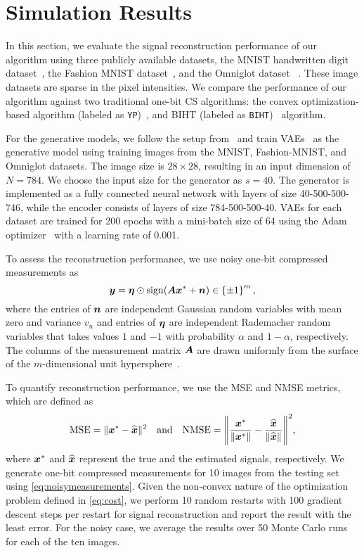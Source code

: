 \documentclass[journal]{IEEEtran}
\DeclareMathOperator{\sign}{sign}
\begin{document}
\section{Simulation Results}\label{sec:sim}
In this section, we evaluate the signal reconstruction performance of our algorithm using three publicly available datasets, the MNIST handwritten digit dataset~\cite{mnist2010LeCun}, the Fashion MNIST dataset~\cite{fashionMnist}, and the Omniglot dataset ~\cite{lake2015human}. These image datasets are sparse in the pixel intensities. We compare the performance of our algorithm against two traditional one-bit CS algorithms: the convex optimization-based algorithm (labeled as \texttt{YP})~\cite{plan2012robust}, and BIHT (labeled as \texttt{BIHT})~\cite{binarystableEmbedd} algorithm. 

For the generative models, we follow the setup from~\cite{bora2017compressed} and train VAEs~\cite{kingma2013auto} as the generative model using training images from the MNIST, Fashion-MNIST, and Omniglot datasets. The image size is $28\times 28$, resulting in an input dimension of $N=784$. We choose the input size for the generator as $s = 40$. The generator is implemented as a fully connected neural network with layers of size 40-500-500-746, while the encoder consists of layers of size 784-500-500-40. VAEs for each dataset are trained for 200 epochs with a mini-batch size of 64 using the Adam optimizer~\cite{kingma2014adam} with a learning rate of 0.001. 

To assess the reconstruction performance, we use noisy one-bit compressed measurements as
\begin{equation} \label{eq:noisymeasurements}
\bs{y}= \bs{\eta}\odot\sign(\matA\vecx^* + \bs{n} ) \in\lc\pm1\rc^m,    
\end{equation}
 where the entries of $\boldsymbol{n}$ are independent Gaussian random variables with mean zero and variance $v_n$ and entries of $\boldsymbol{\eta}$ are independent Rademacher random variables that takes values $1$ and $-1$ with probability $\alpha$ and $1-\alpha$, respectively. The columns of the measurement matrix $\boldsymbol{A}$  are drawn uniformly from the surface of the $m$-dimensional unit hypersphere~\cite{muller1959note}.

To quantify reconstruction performance, we use the MSE and NMSE metrics, which are defined as
\begin{equation}        
\mathrm{MSE} = \|\boldsymbol{x}^* -  \widehat{\boldsymbol{x}} \|^2\quad\text{and}\quad
        \mathrm{NMSE} = \Bigg\|\frac{\boldsymbol{x}^*}{ \| \boldsymbol{x}^*\|} -  \frac{\widehat{\boldsymbol{x}}}{ \| \widehat{\boldsymbol{x}} \|}  \Bigg\|^2,
  \end{equation}
 where $\boldsymbol{x}^*$ and $ \widehat{\boldsymbol{x}}$ represent the true and the estimated signals, respectively. We generate one-bit compressed measurements for 10 images from the testing set using \eqref{eq:noisymeasurements}. Given the non-convex nature of the optimization problem defined in \eqref{eq:cost}, we perform 10 random restarts with 100 gradient descent steps per restart for signal reconstruction and report the result with the least error. For the noisy case, we average the results over 50 Monte Carlo runs for each of the ten images. 
 
\end{document}
